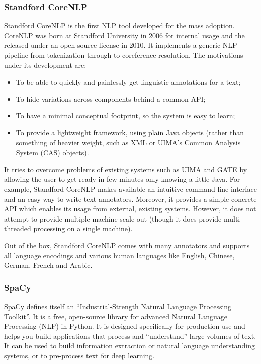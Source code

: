 \subsubsection{Standford CoreNLP}

Standford CoreNLP \cite{manning2014stanford} is the first NLP tool
developed for the mass adoption. CoreNLP was born at Standford
University in 2006 for internal usage and the released under an
open-source license in 2010. It implements a generic NLP pipeline from
tokenization through to coreference resolution. The motivations under
its development are:
\begin{itemize}
  \item To be able to quickly and painlessly get linguistic
  annotations for a text;
  \item To hide variations across components behind a common API;
  \item To have a minimal conceptual footprint, so the system is easy
  to learn;
  \item To provide a lightweight framework, using plain Java objects
  (rather than something of heavier weight, such as XML or UIMA's
  Common Analysis System (CAS) objects).
\end{itemize}
It tries to overcome problems of existing systems such as UIMA
\cite{ferrucci2004uima} and GATE \cite{cunningham2002gate} by allowing
the user to get ready in few minutes only knowing a little Java. For
example, Standford CoreNLP makes available an intuitive command line
interface and an easy way to write text annotators. Moreover, it
provides a simple concrete API which enables its usage from external,
existing systems. However, it does not attempt to provide multiple
machine scale-out (though it does provide multi-threaded processing on
a single machine).

Out of the box, Standford CoreNLP comes with many annotators and
supports all language encodings and various human languages like
English, Chinese, German, French and Arabic.

\subsubsection{SpaCy}

SpaCy \cite{honnibal2020spacy} defines itself an ``Industrial-Strength
Natural Language Processing Toolkit''. It is a free, open-source
library for advanced Natural Language Processing (NLP) in Python. It
is designed specifically for production use and helps you build
applications that process and ``understand'' large volumes of text. It
can be used to build information extraction or natural language
understanding systems, or to pre-process text for deep learning.

